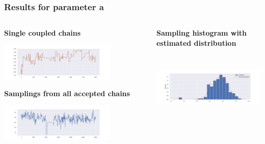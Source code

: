 \documentclass{beamer}
\begin{document}
\begin{frame}
	\frametitle{Results for parameter a}
	\begin{columns}
		\begin{column}{0.4\textwidth}
			{\scriptsize \centering \textbf{Single coupled chains}}\\
			\includegraphics[width=5.5cm,height=2.5cm]{gk_all_pack/gk_all_chain_meeeting_0}
			\vspace{0.2cm}
			{\scriptsize \centering \textbf{Samplings from all accepted chains }}\\
			\includegraphics[width=5.5cm,height=2.5cm]{gk_all_pack/gk_all_sampling_0}
		\end{column}
		\begin{column}{0.4\textwidth}
			{	\scriptsize \centering \textbf{Sampling histogram with estimated distribution}}\\
			\includegraphics[width=6cm,height=4cm]{gk_all_pack/gk_all_histogram_kernel_0}
			
		\end{column}
	\end{columns}
	\end{frame}
\end{document}
